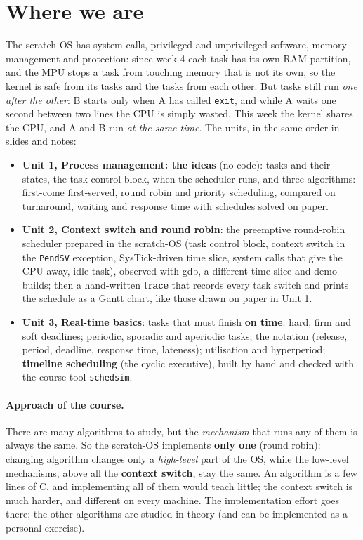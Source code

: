 \section{Where we are}
The scratch-OS has system calls, privileged and unprivileged software, memory management and protection: since week 4 each task has its own RAM partition, and the MPU stops a task from touching memory that is not its own, so the kernel is safe from its tasks and the tasks from each other. But tasks still run \emph{one after the other}: B starts only when A has called \texttt{exit}, and while A waits one second between two lines the CPU is simply wasted. This week the kernel shares the CPU, and A and B run \emph{at the same time}. The units, in the same order in slides and notes:
\begin{itemize}
    \item \textbf{Unit 1, Process management: the ideas} (no code): tasks and their states, the task control block, when the scheduler runs, and three algorithms: first-come first-served, round robin and priority scheduling, compared on turnaround, waiting and response time with schedules solved on paper.
    \item \textbf{Unit 2, Context switch and round robin}: the preemptive round-robin scheduler prepared in the scratch-OS (task control block, context switch in the \texttt{PendSV} exception, SysTick-driven time slice, system calls that give the CPU away, idle task), observed with gdb, a different time slice and demo builds; then a hand-written \textbf{trace} that records every task switch and prints the schedule as a Gantt chart, like those drawn on paper in Unit 1.
    \item \textbf{Unit 3, Real-time basics}: tasks that must finish \textbf{on time}: hard, firm and soft deadlines; periodic, sporadic and aperiodic tasks; the notation (release, period, deadline, response time, lateness); utilisation and hyperperiod; \textbf{timeline scheduling} (the cyclic executive), built by hand and checked with the course tool \texttt{schedsim}.
\end{itemize}
\paragraph{Approach of the course.} There are many algorithms to study, but the \emph{mechanism} that runs any of them is always the same. So the scratch-OS implements \textbf{only one} (round robin): changing algorithm changes only a \emph{high-level} part of the OS, while the low-level mechanisms, above all the \textbf{context switch}, stay the same. An algorithm is a few lines of C, and implementing all of them would teach little; the context switch is much harder, and different on every machine. The implementation effort goes there; the other algorithms are studied in theory (and can be implemented as a personal exercise).

